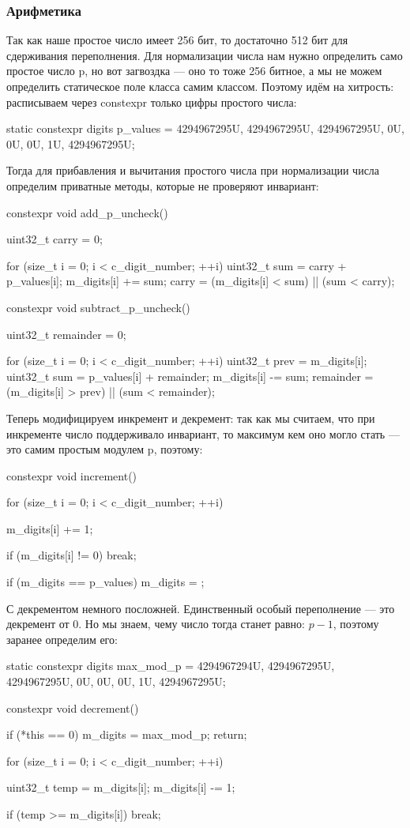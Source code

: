 \subsubsection{Арифметика}
Так как наше простое число имеет 256 бит, то достаточно 512 бит для сдерживания переполнения. Для нормализации числа нам нужно определить само простое число p, но вот загвоздка --- оно то тоже 256 битное, а мы не можем определить статическое поле класса самим классом. Поэтому идём на хитрость: расписываем через constexpr только цифры простого числа:
\begin{cppcode}
static constexpr digits p_values = {4294967295U, 4294967295U, 4294967295U, 0U, 0U, 0U, 1U, 4294967295U};
\end{cppcode}
Тогда для прибавления и вычитания простого числа при нормализации числа определим приватные методы, которые не проверяют инвариант:
\begin{cppcode}
constexpr void add_p_uncheck() {
    uint32_t carry = 0;

    for (size_t i = 0; i < c_digit_number; ++i) {
        uint32_t sum = carry + p_values[i];
        m_digits[i] += sum;
        carry = (m_digits[i] < sum) || (sum < carry);
    }
}

constexpr void subtract_p_uncheck() {
    uint32_t remainder = 0;

    for (size_t i = 0; i < c_digit_number; ++i) {
        uint32_t prev = m_digits[i];
        uint32_t sum = p_values[i] + remainder;
        m_digits[i] -= sum;
        remainder = (m_digits[i] > prev) || (sum < remainder);
    }
}
\end{cppcode}
Теперь модифицируем инкремент и декремент: так как мы считаем, что при инкременте число поддерживало инвариант, то максимум кем оно могло стать --- это самим простым модулем p, поэтому:
\begin{cppcode}
constexpr void increment() {
    for (size_t i = 0; i < c_digit_number; ++i) {
        m_digits[i] += 1;

        if (m_digits[i] != 0) {
            break;
        }
    }

    if (m_digits == p_values) {
        m_digits = {};
    }
}
\end{cppcode}
С декрементом немного посложней. Единственный особый переполнение --- это декремент от 0. Но мы знаем, чему число тогда станет равно: $p-1$, поэтому заранее определим его:
\begin{cppcode}
static constexpr digits max_mod_p = {4294967294U, 4294967295U, 4294967295U, 0U, 0U, 0U, 1U, 4294967295U};

constexpr void decrement() {
    if (*this == 0) {
        m_digits = max_mod_p;
        return;
    }

    for (size_t i = 0; i < c_digit_number; ++i) {
        uint32_t temp = m_digits[i];
        m_digits[i] -= 1;

        if (temp >= m_digits[i]) {
            break;
        }
    }
}
\end{cppcode}
